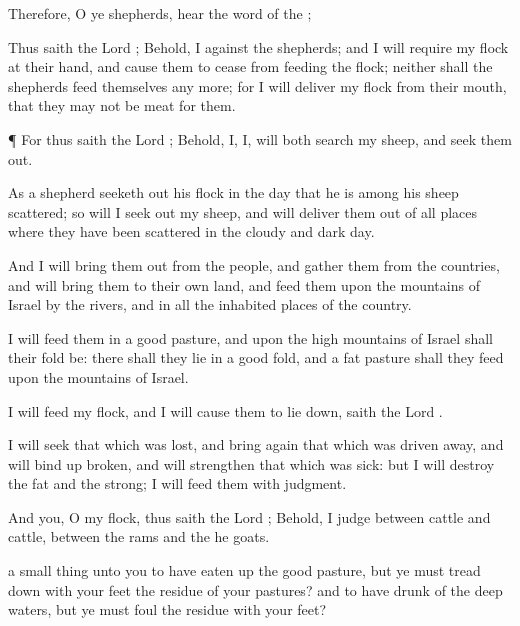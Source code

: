 {Therefore, O ye
shepherds,
hear the
word of the
{};

Thus
saith the
Lord
{}; Behold, I
{} against the
shepherds; and I will
require my
flock at their
hand, and cause them to
cease from
feeding the
flock; neither shall the
shepherds
feed themselves any more; for I will
deliver my
flock from their
mouth, that they may not be
meat for them.


\par }{\PP {}¶ For thus
saith the
Lord
{}; Behold, I,
{} I, will both
search my
sheep, and seek them
out.

As a
shepherd seeketh
out his
flock in the
day that he is
among his
sheep
{}
scattered; so will I seek
out my
sheep, and will
deliver them out of all
places where they have been
scattered in the
cloudy and
dark
day.

And I will bring them
out from the
people, and
gather them from the
countries, and will
bring them to their own
land, and
feed them upon the
mountains of
Israel by the
rivers, and in all the inhabited
places of the
country.

I will
feed them in a
good
pasture, and upon the
high
mountains of
Israel shall their
fold be: there shall they
lie in a
good
fold, and
{} a
fat
pasture shall they
feed upon the
mountains of
Israel.

I will
feed my
flock, and I will cause them to lie
down,
saith the
Lord
{}.

I will
seek that which was
lost, and bring
again that which was driven
away, and will bind
up
{}
broken, and will
strengthen that which was
sick: but I will
destroy the
fat and the
strong; I will
feed them with
judgment.


\par }{\PP {}And
{}
you, O my
flock, thus
saith the
Lord
{}; Behold, I
judge between
cattle and
cattle, between the
rams and the he
goats.

 a small
thing unto you to have eaten
up the
good
pasture, but ye must tread
down with your
feet the
residue of your
pastures? and to have
drunk of the
deep
waters, but ye must
foul the
residue with your
feet?

}
